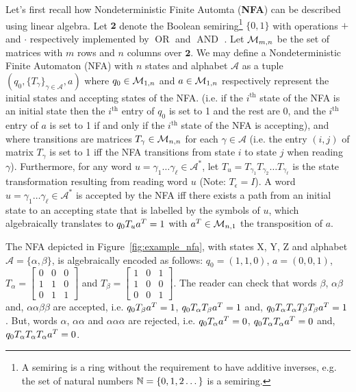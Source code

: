 Let's first recall how Nondeterministic Finite Automta (\textbf{NFA}) can be described using linear algebra. Let $\mathbf{2}$ denote the Boolean semiring\footnote{A semiring is a ring without the requirement to have additive inverses, e.g. the set of natural numbers $\mathbb{N}=\{0,1,2\dots\}$ is a semiring.} $\{0,1\}$ with operations $+$ and $\cdot$ respectively implemented by $\operatorname{OR}$ and $\operatorname{AND}$ \cite{CUNINGHAMEGREEN1991251}.
Let $\mathcal{M}_{m,n}$ be the set of matrices with $m$ rows and $n$ columns over $\mathbf{2}$. We may define a Nondeterministic Finite Automaton (NFA) with $n$ states and alphabet $\mathcal{A}$ as a tuple $(q_0, \{T_\gamma\}_{\gamma \in \mathcal{A}}, a)$ where $q_0 \in \mathcal{M}_{1,n}$ and $a \in \mathcal{M}_{1,n}$ respectively represent the initial states and accepting states of the NFA. (i.e. if the $i^\text{th}$ state of the NFA is an initial state then the $i^\text{th}$ entry of $q_0$ is set to 1 and the rest are 0, and the $i^\text{th}$ entry of $a$ is set to 1 if and only if the $i^\text{th}$ state of the NFA is accepting), and where transitions are matrices $T_\gamma\in \mathcal{M}_{n,n}$ for each $\gamma\in\mathcal{A}$ (i.e. the entry $(i,j)$ of matrix $T_\gamma$ is set to 1 iff the NFA transitions from state $i$ to state $j$ when reading $\gamma$). Furthermore, for any word $u=\gamma_1\dots\gamma_\ell \in \mathcal{A}^*$, let $T_u = T_{\gamma_1} T_{\gamma_2} \dots T_{\gamma_\ell}$ is the state transformation resulting from reading word $u$ (Note: $T_\epsilon = I$). A word $u=\gamma_1\dots\gamma_\ell \in \mathcal{A}^*$ is accepted by the NFA iff there exists a path from an initial state to an accepting state that is labelled by the symbols of $u$, which algebraically translates to $q_0 T_u a^T = 1$ with $a^T \in \mathcal{M}_{n,1}$ the transposition of $a$.



\begin{example}\label{ex:nfa}\normalfont
  The NFA depicted in Figure~\ref{fig:example_nfa}, with states X, Y, Z and alphabet $\mathcal{A}=\{\alpha,\beta\}$, is algebraically encoded as follows: $q_0 = (1,1,0)$, $a=(0,0,1)$, $T_\alpha=\begin{bmatrix}
      0 & 0 & 0 \\
      1 & 1 & 0 \\
      0 & 1 & 1
    \end{bmatrix}$ and $T_\beta= \begin{bmatrix}
      1 & 0 & 1 \\
      1 & 0 & 0 \\
      0 & 0 & 1
    \end{bmatrix}$. The reader can check that words $\beta$, $\alpha\beta$ and, $\alpha\alpha\beta\beta$ are accepted, i.e. $q_0T_\beta a^T = 1$, $q_0T_\alpha T_\beta a^T = 1$ and, $q_0T_\alpha T_\alpha T_\beta T_\beta a ^T = 1$. But, words $\alpha$, $\alpha\alpha$ and $\alpha\alpha\alpha$ are rejected, i.e. $q_0T_\alpha a^T = 0$, $q_0T_\alpha T_\alpha a^T = 0$ and, $q_0T_\alpha T_\alpha T_\alpha a ^T = 0$.
\end{example}


